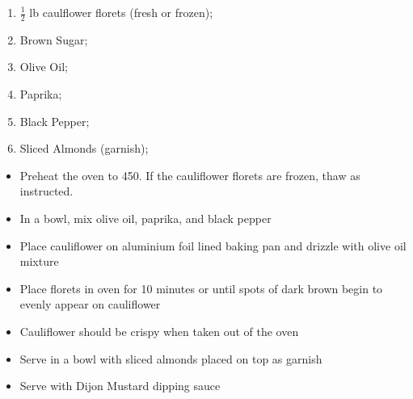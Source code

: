 \documentclass[oneside]{recipe}
\newcommand{\recipecolumn}[2]{
	\begin{multicols}{2}
	\raggedcolumns
	#1
	\columnbreak
	#2
	\end{multicols}
}
\begin{document}
\recipecolumn{
	\begin{enumerate}
		\item $\frac{1}{2}$ lb caulflower florets (fresh or frozen);
		\item Brown Sugar;
		\item Olive Oil;
		\item Paprika;
		\item Black Pepper;
		\item Sliced Almonds (garnish);
	\end{enumerate}
}{
	\begin{itemize}
		\item Preheat the oven to 450. If the cauliflower florets are frozen, thaw as instructed.
		\item In a bowl, mix olive oil, paprika, and black pepper
		\item Place cauliflower on aluminium foil lined baking pan and drizzle with olive oil mixture
		\item Place florets in oven for 10 minutes or until spots of dark brown begin to evenly appear on cauliflower
		\item Cauliflower should be crispy when taken out of the oven
		\item Serve in a bowl with sliced almonds placed on top as garnish
		\item Serve with Dijon Mustard dipping sauce
	\end{itemize}
}
\newpage
{}
\end{document}
